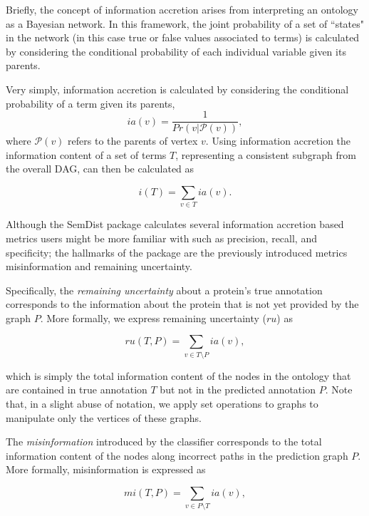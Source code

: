 \documentclass{article}
\begin{document}
Briefly, the concept of information accretion arises from interpreting an ontology as a Bayesian network.  In this framework,  the joint probability of a set of ``states" in the network (in this case true or false values associated to terms) is calculated by considering the conditional probability of each individual variable given its parents.

Very simply, information accretion is calculated by considering the conditional probability of a term given its parents,
\begin{equation}
ia(v)= \frac{1}{Pr(v|\mathcal{P}(v))},
\label{eq:IA}
\end{equation}
where $\mathcal{P}(v)$ refers to the parents of vertex $v$. Using information accretion the information content of a set of terms $T$, representing a consistent subgraph from the overall DAG, can then be calculated as

\begin{equation}
i(T)  = \underset{v\in T}{\sum}ia(v).
\end{equation}

Although the SemDist package calculates several information accretion based metrics users might be more familiar with such as precision, recall, and specificity; the hallmarks of the package are the previously introduced metrics misinformation and remaining uncertainty.


Specifically, the \emph{remaining uncertainty} about a protein's true annotation corresponds to the information about the protein that is not yet provided by the graph $P$. More formally, we express remaining uncertainty ($ru$) as

\begin{equation}
ru(T,P)=\underset{v\in T\setminus P}{\sum}ia(v),
\label{eq:ruSIMP}
\end{equation}


\noindent which is simply the total information content of the nodes in the ontology that are contained in true annotation $T$ but not in the predicted annotation $P$. Note that, in a slight abuse of notation, we apply set operations to graphs to manipulate only the vertices of these graphs.


The \emph{misinformation} introduced by the classifier corresponds to the total information content of the nodes along incorrect paths in the prediction graph $P$. More formally, misinformation is expressed as

\begin{equation}
mi(T,P)=\underset{v\in P\setminus T}{\sum}ia(v),
\label{eq:miSIMP}
\end{equation}
\end{document}
